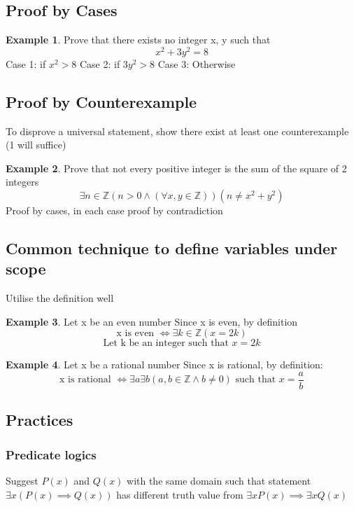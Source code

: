 \documentclass[14pt]{article}
\theoremstyle{definition}
\newtheorem*{example}{Example}
\begin{document}
\subsection{Proof by Cases} 
\begin{example}
    Prove that there exists no integer x, y such that
    \[x^2 + 3y^2 = 8\]
    Case 1: if \(x^2 > 8\)
    Case 2: if \(3y^2 > 8\)
    Case 3: Otherwise
\end{example}
\subsection{Proof by Counterexample}
To disprove a universal statement, show there exist at least one counterexample (1 will suffice)

\begin{example}
    Prove that not every positive integer is the sum of the square of 2 integers
    \[\exists n \in \mathbb{Z} (n > 0 \land (\forall x,y \in \mathbb{Z}))(n \neq x^2 + y^2)\]
    Proof by cases, in each case proof by contradiction
\end{example}
\newpage
\subsection{Common technique to define variables under scope}
Utilise the definition well

\begin{example}
    Let x be an even number
    Since x is even, by definition 
    \[\text{x is even } \iff \exists k \in \mathbb{Z} (x = 2k)\]
    \[\text{Let k be an integer such that } x = 2k\]
\end{example}

\begin{example}
    Let x be a rational number
    Since x is rational, by definition:
    \[\text{x is rational } \iff \exists a \exists b (a, b \in \mathbb{Z} \land b \neq 0) \text{ such that } x = \frac{a}{b}\]
\end{example}

\subsection{Practices}
\subsubsection{Predicate logics} 
Suggest $P(x)$ and $Q(x)$ with the same domain such that statement $\exists x (P(x) \implies Q(x))$ has different truth value from $\exists x P(x) \implies \exists x Q(x)$
\end{document}
